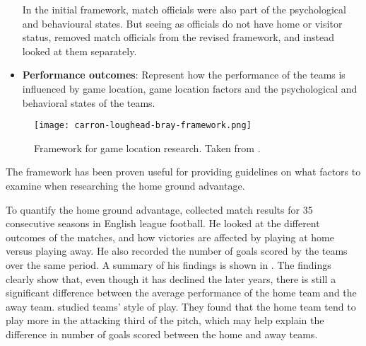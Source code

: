 \begin{itemize}
    In the initial framework, match officials were also part of the psychological and behavioural states. But seeing as officials do not have home or visitor status, \citet{bib:carron-loughead-bray-2005} removed match officials from the revised framework, and instead looked at them separately.
    
    \item \textbf{Performance outcomes}: Represent how the performance of the teams is influenced by game location, game location factors and the psychological and behavioral states of the teams.
\end{itemize}

\begin{figure}
    \centering
    \texttt{[image: carron-loughead-bray-framework.png]}
    \caption{Framework for game location research. Taken from \citet{bib:carron-loughead-bray-2005}.}
    \label{fig:carron-loughead-bray-framework}
\end{figure}

The framework has been proven useful for providing guidelines on what factors to examine when researching the home ground advantage.

To quantify the home ground advantage, \citet{bib:goddard-2006} collected match results for 35 consecutive seasons in English league football. He looked at the different outcomes of the matches, and how victories are affected by playing at home versus playing away. He also recorded the number of goals scored by the teams over the same period. A summary of his findings is shown in . The findings clearly show that, even though it has declined the later years, there is still a significant difference between the average performance of the home team and the away team. \citet{bib:bialkowski-lucey-carr-yue-sridharan-matthews-2014} studied teams' style of play. They found that the home team tend to play more in the attacking third of the pitch, which may help explain the difference in number of goals scored between the home and away teams.


